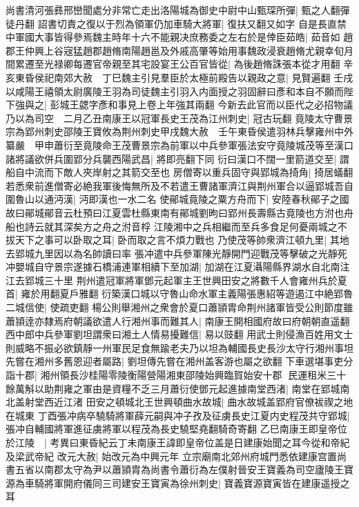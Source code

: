 尚書清河張彞邢巒聞處分非常亡走出洛陽城為御史中尉中山甄琛所彈|{
	甄之人翻彈徒丹翻}
詔書切責之復以于烈為領軍仍加車騎大將軍|{
	復扶又翻又如字}
自是長直禁中軍國大事皆得參焉魏主時年十六不能親决庶務委之左右於是倖臣茹皓|{
	茹音如}
趙郡王仲興上谷宼猛趙郡趙脩南陽趙邕及外戚高肇等始用事魏政浸衰趙脩尤親幸旬月間累遷至光禄卿每遷官帝親至其宅設宴王公百官皆從|{
	為後趙脩誅張本從才用翻}
辛亥東昏侯祀南郊大赦　丁巳魏主引見羣臣於太極前殿告以親政之意|{
	見賢遍翻}
壬戌以咸陽王禧領太尉廣陵王羽為司徒魏主引羽入内面授之羽固辭曰彥和本自不願而陛下強與之|{
	彭城王勰字彥和事見上卷上年強其兩翻}
今新去此官而以臣代之必招物議乃以為司空　二月乙丑南康王以冠軍長史王茂為江州刺史|{
	冠古玩翻}
竟陵太守曹景宗為郢州刺史邵陵王寶攸為荆州刺史甲戌魏大赦　壬午東昏侯遣羽林兵擊雍州中外纂嚴　甲申蕭衍至竟陵命王茂曹景宗為前軍以中兵參軍張法安守竟陵城茂等至漢口諸將議欲併兵圍郢分兵襲西陽武昌|{
	將即亮翻下同}
衍曰漢口不闊一里箭道交至|{
	謂船自中流而下敵人夾岸射之其箭交至也}
房僧寄以重兵固守與郢城為掎角|{
	掎居蟻翻}
若悉衆前進僧寄必絶我軍後悔無所及不若遣王曹諸軍濟江與荆州軍合以逼郢城吾自圍魯山以通沔漢|{
	沔即漢也一水二名}
使鄖城竟陵之粟方舟而下|{
	安陸春秋鄖子之國故曰鄖城鄖音云杜預曰江夏雲杜縣東南有鄖城劉昫曰郢州長壽縣古竟陵也方泭也舟船也詩云就其深矣方之舟之泭音桴}
江陵湘中之兵相繼而至兵多食足何憂兩城之不拔天下之事可以卧取之耳|{
	卧而取之言不煩力戰也}
乃使茂等帥衆濟江頓九里|{
	其地去郢城九里因以為名帥讀曰率}
張冲遣中兵參軍陳光靜開門迎戰茂等擊破之光靜死冲嬰城自守景宗遂據石橋浦連軍相續下至加湖|{
	加湖在江夏灄陽縣界湖水自北南注江去郢城三十里}
荆州遣冠軍將軍鄧元起軍主王世興田安之將數千人會雍州兵於夏首|{
	雍於用翻夏戶雅翻}
衍築漢口城以守魯山命水軍主義陽張惠紹等遊遏江中絶郢魯二城信使|{
	使疏吏翻}
楊公則舉湘州之衆會於夏口蕭頴胄命荆州諸軍皆受公則節度雖蕭頴逹亦隸焉府朝議欲遣人行湘州事而難其人|{
	南康王開相國府故曰府朝朝直遥翻}
西中郎中兵參軍劉坦謂衆曰湘土人情易擾難信|{
	易以豉翻}
用武士則侵漁百姓用文士則威略不振必欲鎮靜一州軍民足食無踰老夫乃以坦為輔國長史長沙太守行湘州事坦先嘗在湘州多舊恩迎者屬路|{
	劉坦傳先嘗在湘州盖客游也屬之欲翻}
下車選堪事吏分詣十郡|{
	湘州領長沙桂陽零陵衡陽營陽湘東邵陵始興臨賀始安十郡}
民運租米三十餘萬斛以助荆雍之軍由是資糧不乏三月蕭衍使鄧元起進據南堂西渚|{
	南堂在郢城南北盖射堂西近江渚}
田安之頓城北王世興頓曲水故城|{
	曲水故城盖郢府官僚袚禊之地在城東}
丁酉張冲病卒驍騎將軍薛元嗣與冲子孜及征虜長史江夏内史程茂共守郢城|{
	張冲自輔國將軍進征虜將軍以程茂為長史驍堅堯翻騎奇寄翻}
乙巳南康王即皇帝位於江陵　|{
	考異曰東昏紀云丁未南康王諱即皇帝位盖是日建康始聞之耳今從和帝紀及梁武帝紀}
改元大赦|{
	始改元為中興元年}
立宗廟南北郊州府城門悉依建康宫置尚書五省以南郡太守為尹以蕭頴胄為尚書令蕭衍為左僕射晉安王寶義為司空廬陵王寶源為車騎將軍開府儀同三司建安王寶寅為徐州刺史|{
	寶義寶源寶寅皆在建康遥授之耳}
